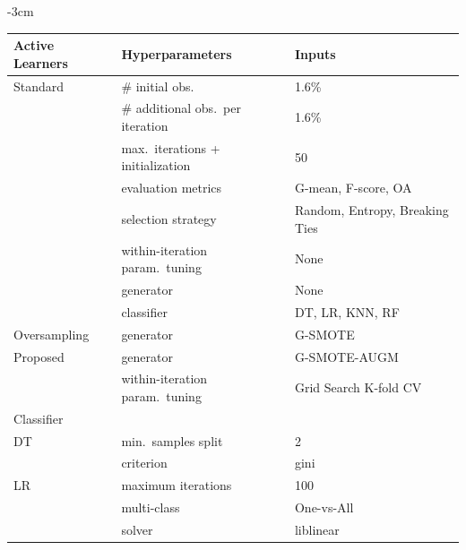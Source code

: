 \begin{table}
	\centering
    \addtolength{\leftskip} {-3cm}
    \addtolength{\rightskip}{-3cm}
	\begin{tabular}{lll}
		\toprule
		Active Learners & Hyperparameters                   & Inputs                         \\
		\midrule
		Standard        & \# initial obs.\                  & 1.6\%                          \\
                        & \# additional obs.\ per iteration & 1.6\%                          \\
                        & max.\ iterations + initialization & 50                             \\
                        & evaluation metrics                & G-mean, F-score, OA            \\
                        & selection strategy                & Random, Entropy, Breaking Ties \\
                        & within-iteration param.\ tuning   & None                           \\
                        & generator                         & None                           \\
                        & classifier                        & DT, LR, KNN, RF                \\
        Oversampling    & generator                         & G-SMOTE                        \\
        Proposed        & generator                         & G-SMOTE-AUGM                   \\
                        & within-iteration param.\ tuning   & Grid Search K-fold CV          \\
		\toprule
		Classifier      &                                  &                                \\
		\midrule
        DT              & min.\ samples split              & 2                              \\
                        & criterion                        & gini                           \\
		LR              & maximum iterations               & 100                            \\
                        & multi-class                      & One-vs-All                     \\
		                & solver                           & liblinear                      \\

\end{tabular}
\end{table}
